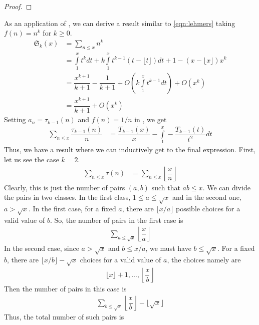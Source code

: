 \documentclass[elemannt.tex]{subfile}
\begin{document}
		\begin{proof}

		\end{proof}
	As an application of , we can derive a result similar to \ref{eqn:lehmers} taking  $f(n)=n^{k}$ for $k\geq 0$.
		\begin{align*}
			\mathfrak{S}_{k}(x)
				& = \sum_{n\leq x}n^{k}\\
				& = \int\limits_{1}^{x}t^{k}dt+k\int\limits_{1}^{x}t^{k-1}(t-\lfloor{t}\rfloor)dt+1-(x-\lfloor{x}\rfloor)x^{k}\\
				& = \dfrac{x^{k+1}}{k+1}-\dfrac{1}{k+1}+O\left(k\int\limits_{1}^{x}t^{k-1}dt\right)+O(x^{k})\\
				& = \dfrac{x^{k+1}}{k+1}+O(x^{k})
		\end{align*}
	Setting $a_{n}=\tau_{k-1}(n)$ and $f(n)=1/n$ in , we get
		\begin{align*}
			\sum_{n\leq x}\dfrac{\tau_{k-1}(n)}{n}
				& = \dfrac{T_{k-1}(x)}{x}-\int\limits_{1}^{x}-\dfrac{T_{k-1}(t)}{t^{2}}dt
		\end{align*}
	Thus, we have a result where we can inductively get to the final expression. First, let us see the case $k=2$.
		\begin{align*}
			\sum_{n\leq x}\tau(n)
				& = \sum_{n\leq x}\left\lfloor{\dfrac{x}{n}}\right\rfloor
		\end{align*}
	Clearly, this is just the number of pairs $(a,b)$ such that $ab\leq x$. We can divide the pairs in two classes. In the first class, $1\leq a\leq \sqrt{x}$ and in the second one, $a>\sqrt{x}$. In the first case, for a fixed $a$, there are $\lfloor{x/a}\rfloor$ possible choices for a valid value of $b$. So, the number of pairs in the first case is
		\begin{align*}
			\sum_{a\leq \sqrt{x}}\left\lfloor{\dfrac{x}{a}}\right\rfloor
		\end{align*}
	In the second case, since $a>\sqrt{x}$ and $b\leq x/a$, we must have $b\leq \sqrt{x}$. For a fixed $b$, there are $\lfloor{x/b}\rfloor-\sqrt{x}$ choices for a valid value of $a$, the choices namely are
		\begin{align*}
			\lfloor{x}\rfloor+1,\ldots,\left\lfloor{\dfrac{x}{b}}\right\rfloor
		\end{align*}
	Then the number of pairs in this case is
		\begin{align*}
			\sum_{b\leq \sqrt{x}}\left\lfloor{\dfrac{x}{b}}\right\rfloor-\lfloor{\sqrt{x}}\rfloor
		\end{align*}
	Thus, the total number of such pairs is
\end{document}
